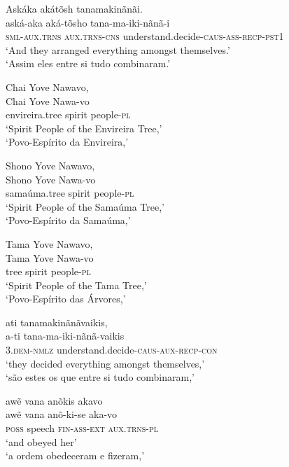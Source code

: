 \documentclass[output=paper,
modfonts,nonflat
]{langsci/langscibook}
\begin{document}
\ea Askáka akátõsh tanamakinãnãi. \\[.3em]
\gll aská-aka              aká-tõsho             tana-ma-iki-nãnã-i                                 \\
     \textsc{sml-aux.trns} \textsc{aux.trns-cns} understand.decide-\textsc{caus-ass-recp-pst1} \\
\glt `And they arranged everything amongst themselves.' \\
`Assim eles entre si tudo combinaram.' \\
\z

\ea Chai Yove Nawavo, \\[.3em]
\gll Chai           Yove   Nawa-vo            \\
     envireira.tree spirit people-\textsc{pl} \\
\glt `Spirit People of the Envireira Tree,' \\
`Povo-Espírito da Envireira,' \\
\z

\ea Shono Yove Nawavo, \\[.3em]
\gll Shono        Yove   Nawa-vo            \\
     samaúma.tree spirit people-\textsc{pl} \\
\glt `Spirit People of the Samaúma Tree,' \\
`Povo-Espírito da Samaúma,' \\
\z

\ea Tama Yove Nawavo, \\[.3em]
\gll Tama Yove   Nawa-vo            \\
     tree spirit people-\textsc{pl} \\
\glt `Spirit People of the Tama Tree,' \\
`Povo-Espírito das Árvores,'\\
\z

\ea ati tanamakinãnãvaikis, \\[.3em]
\gll a-ti                tana-ma-iki-nãnã-vaikis                      \\
     3.\textsc{dem-nmlz} understand.decide-\textsc{caus-aux-recp-con} \\
\glt `they decided everything amongst themselves,' \\
`são estes os que entre si tudo combinaram,'\\
\z

\ea awẽ vana anõkis akavo \\[.3em]
\gll awẽ           vana   anõ-ki-se            aka-vo               \\
     \textsc{poss} speech \textsc{fin-ass-ext} \textsc{aux.trns-pl} \\
\glt `and obeyed her' \\
`a ordem obedeceram e fizeram,'\\
\z
\end{document}
